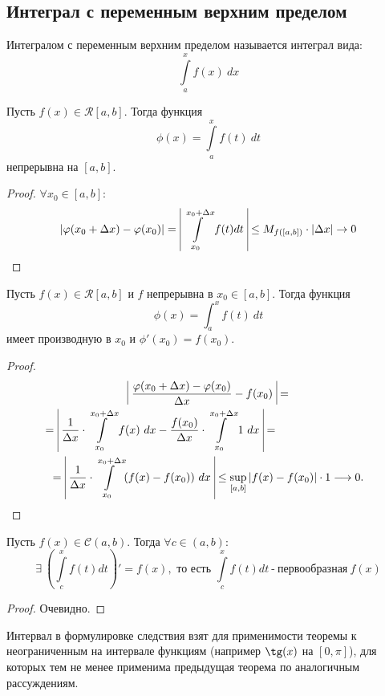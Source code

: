 \subsection{Интеграл с переменным верхним пределом}
\begin{definition}
    Интегралом с переменным верхним пределом называется интеграл вида:
    \[\int\limits_{a}^{x} f(x)\ dx\]
\end{definition} 
\begin{theorem}
    Пусть $f(x)\in \mathcal{R}[a, b]$. Тогда функция
    \[\phi(x) = \int\limits_{a}^{x} f(t)\ dt\]
    непрерывна на $[a, b]$.
\end{theorem}
\begin{proof} 
    $\forall x_0\in [a,b]:$
    \[|\phi(x_0 + \Delta x) - \phi(x_0)| =\ \vline\int\limits_{x_0}^{x_0 + \Delta x} f(t) dt\ \vline \leq M_{f([a, b])}\cdot |\Delta x| \rightarrow 0\]
\end{proof}
\begin{theorem}
    Пусть $f(x)\in \mathcal{R}[a, b]$ и $f$ непрерывна в $x_0 \in [a, b]$. Тогда функция
    \[\phi(x) = \int_{a}^{x} f(t)\ dt\]
    имеет производную в $x_0$ и $\phi'(x_0) = f(x_0)$.
\end{theorem}
\begin{proof}
    \begin{multline*}
        \vline\ \frac{\phi(x_0 + \Delta x) - \phi(x_0)}{\Delta x} - f(x_0)\ \vline =\\=\ \vline\frac{1}{\Delta x}\cdot \int\limits_{x_0}^{x_0 + \Delta x} f(x)\ dx - \frac{f(x_0)}{\Delta x} \cdot \int\limits_{x_0}^{x_0 + \Delta x} 1\ dx\ \vline =\tab[3cm]\\=\ \vline\frac{1}{\Delta x}\cdot \int\limits_{x_0}^{x_0 + \Delta x} (f(x) - f(x_0))\ dx\ \vline \leq \sup \limits_{[a, b]}|f(x) - f(x_0)|\cdot 1 \longrightarrow 0.
    \end{multline*}
\end{proof}
\begin{consequense}
    Пусть $f(x) \in \mathcal{C}(a, b)$. Тогда $\forall c \in (a, b)$:
    \[\exists \ \left(\int\limits_{c}^{x} f(t)dt\right)' = f(x), \text{ то есть } \int\limits_{c}^{x} f(t)dt\ \text{-}\ \text{первообразная} \ f(x)\]
\end{consequense}
\begin{proof}
    Очевидно.
\end{proof}
\begin{comm}
    Интервал в формулировке следствия взят для применимости теоремы к неограниченным на интервале функциям (например $\tg(x)$ на $[0, \pi]$), для которых тем не менее применима предыдущая теорема по аналогичным рассуждениям.
\end{comm}
